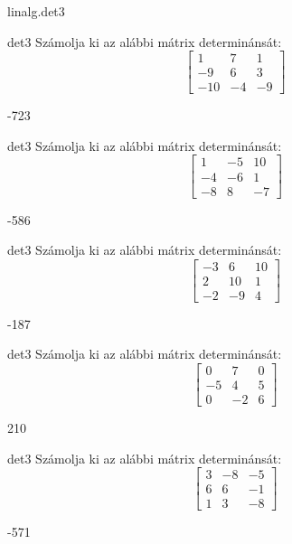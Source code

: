 \documentclass[12pt]{article}
\begin{document}
\begin{quiz}{linalg.det3}
\begin{numerical}{det3}
Számolja ki az alábbi mátrix determinánsát:
$$\left[\begin{array}{ccc}1& 7& 1\\ -9& 6& 3\\ -10& -4& -9\end{array}\right]$$

\item -723
\end{numerical}


\begin{numerical}{det3}
Számolja ki az alábbi mátrix determinánsát:
$$\left[\begin{array}{ccc}1& -5& 10\\ -4& -6& 1\\ -8& 8& -7\end{array}\right]$$

\item -586
\end{numerical}


\begin{numerical}{det3}
Számolja ki az alábbi mátrix determinánsát:
$$\left[\begin{array}{ccc}-3& 6& 10\\ 2& 10& 1\\ -2& -9& 4\end{array}\right]$$

\item -187
\end{numerical}


\begin{numerical}{det3}
Számolja ki az alábbi mátrix determinánsát:
$$\left[\begin{array}{ccc}0& 7& 0\\ -5& 4& 5\\ 0& -2& 6\end{array}\right]$$

\item 210
\end{numerical}


\begin{numerical}{det3}
Számolja ki az alábbi mátrix determinánsát:
$$\left[\begin{array}{ccc}3& -8& -5\\ 6& 6& -1\\ 1& 3& -8\end{array}\right]$$

\item -571
\end{numerical}



\end{quiz}
\end{document}
